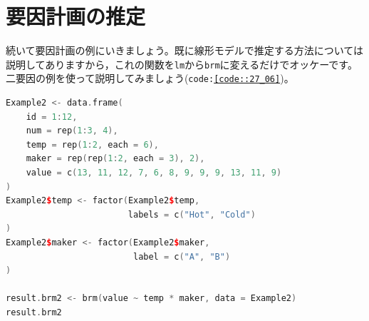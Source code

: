 \documentclass{ltjbook}
\begin{document}
\section{要因計画の推定}
続いて要因計画の例にいきましょう。既に線形モデルで推定する方法については説明してありますから，これの関数を\texttt{lm}から\texttt{brm}に変えるだけでオッケーです。二要因の例を使って説明してみましょう(\texttt{code:\ref{code::27_06}})。

\begin{lstlisting}[language=c++,label={code::27_06},caption={データを作ってbrmでベイズ推定}]
Example2 <- data.frame(
    id = 1:12,
    num = rep(1:3, 4),
    temp = rep(1:2, each = 6),
    maker = rep(rep(1:2, each = 3), 2),
    value = c(13, 11, 12, 7, 6, 8, 9, 9, 9, 13, 11, 9)
)
Example2$temp <- factor(Example2$temp,
                        labels = c("Hot", "Cold")
)
Example2$maker <- factor(Example2$maker,
                         label = c("A", "B")
)

result.brm2 <- brm(value ~ temp * maker, data = Example2)
result.brm2
\end{lstlisting}
\end{document}
